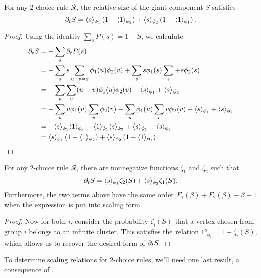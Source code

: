 \documentclass[twoside,10pt]{article}
\begin{document}
\begin{lem}
        \label{2c-sdelS}
        For any 2-choice rule $\mathcal{R}$, the relative size of the giant component $S$ satisfies
	\[
		\partial_{t}{S} = \langle s \rangle_{\phi_1}\left( 1-\langle 1 \rangle_{\phi_2} \right) + \langle s \rangle_{\phi_2}\left( 1-\langle 1 \rangle_{\phi_1} \right).
	\] 
\end{lem}
\begin{proof}
        Using the identity $\sum_s P(s) = 1-S$, we calculate
        \begin{align*}
                \partial_{t}{S} &= - \sum_s \partial_{t}{P(s)} \\
                          &= - \sum_s s \sum_{u+v=s}\phi_1(u)\phi_2(v) + \sum_s s \phi_1(s) \sum_s + s \phi_2(s) \\
                          &= - \sum_u \sum_v (u+v) \phi_1(u)\phi_2(v) + \langle s \rangle_{\phi_1} + \langle s \rangle_{\phi_2} \\
                          &= -\sum_{u}u \phi_1(u) \sum_{v} \phi_2(v) - \sum_{u}\phi_1(u)\sum_{v}v \phi_2(v) + \langle s \rangle_{\phi_1} + \langle s \rangle_{\phi_2} \\
                          &= -\langle s \rangle_{\phi_1}\langle 1 \rangle_{\phi_2} - \langle 1 \rangle_{\phi_1}\langle s \rangle_{\phi_2} + \langle s \rangle_{\phi_1}+\langle s \rangle_{\phi_2} \\
                          &= \langle s \rangle_{\phi_1}\left( 1-\langle 1 \rangle_{\phi_2} \right) + \langle s \rangle_{\phi_2}\left( 1-\langle 1 \rangle_{\phi_1} \right).
        \end{align*}
\end{proof}

\begin{thrm}
	\label{2c-same-order}
	For any 2-choice rule $\mathcal{R}$, there are nonnegative functions $\zeta_1$ and $\zeta_2$ such that
	\[
		\partial_{t}{S} = \langle s \rangle_{\phi_1}\zeta_2(S) + \langle s \rangle_{\phi_2}\zeta_1(S).
	\] 
	Furthermore, the two terms above have the same order $F_1(\beta) + F_2(\beta) - \beta+1$ when the expression is put into scaling form.
\end{thrm}
\begin{proof}

	Now for both $i$, consider the probability $\zeta_i(S)$ that a vertex chosen from group $i$ belongs to an infinite cluster. This satisfies the relation $\ang{1}_{\phi_i} = 1-\zeta_i(S)$, which allows us to recover the desired form of $\partial_{t}{S} $.

\end{proof}

To determine scaling relations for 2-choice rules, we'll need one last result, a consequence of .
\end{document}
